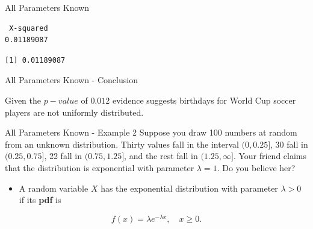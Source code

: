 \documentclass[
  ignorenonframetext,
]{beamer}
\newenvironment{Shaded}{\begin{snugshade}}{\end{snugshade}}
\newcommand{\AttributeTok}[1]{\textcolor[rgb]{0.13,0.29,0.53}{#1}}
\newcommand{\CommentTok}[1]{\textcolor[rgb]{0.56,0.35,0.01}{\textit{#1}}}
\newcommand{\ConstantTok}[1]{\textcolor[rgb]{0.56,0.35,0.01}{#1}}
\newcommand{\DecValTok}[1]{\textcolor[rgb]{0.00,0.00,0.81}{#1}}
\newcommand{\FunctionTok}[1]{\textcolor[rgb]{0.13,0.29,0.53}{\textbf{#1}}}
\newcommand{\NormalTok}[1]{#1}
\newcommand{\OtherTok}[1]{\textcolor[rgb]{0.56,0.35,0.01}{#1}}
\newcommand{\SpecialCharTok}[1]{\textcolor[rgb]{0.81,0.36,0.00}{\textbf{#1}}}
\providecommand{\tightlist}{%
  \setlength{\itemsep}{0pt}\setlength{\parskip}{0pt}}
\begin{document}
\begin{frame}[fragile]{All Parameters Known}
\protect\hypertarget{all-parameters-known-4}{}
\begin{Shaded}
\end{Shaded}

\begin{verbatim}
 X-squared 
0.01189087 
\end{verbatim}

\begin{Shaded}
\end{Shaded}

\begin{verbatim}
[1] 0.01189087
\end{verbatim}
\end{frame}

\begin{frame}{All Parameters Known - Conclusion}
\protect\hypertarget{all-parameters-known---conclusion}{}
\begin{tcolorbox}
Given the $p-value$ of $0.012$ evidence suggests birthdays for World Cup soccer players are not uniformly distributed.
\end{tcolorbox}
\end{frame}

\begin{frame}{All Parameters Known - Example 2}
\protect\hypertarget{all-parameters-known---example-2}{}
Suppose you draw 100 numbers at random from an unknown distribution.
Thirty values fall in the interval \((0, 0.25]\), 30 fall in
\((0.25, 0.75]\), 22 fall in \((0.75, 1.25]\), and the rest fall in
\((1.25, \infty]\). Your friend claims that the distribution is
exponential with parameter \(\lambda = 1\). Do you believe her?

\begin{itemize}
\tightlist
\item
  A random variable \(X\) has the exponential distribution with
  parameter \(\lambda > 0\) if its \textbf{pdf} is
\end{itemize}

\[f(x) = \lambda e^{-\lambda x},\quad x \geq 0.\]
\end{frame}
\end{document}
